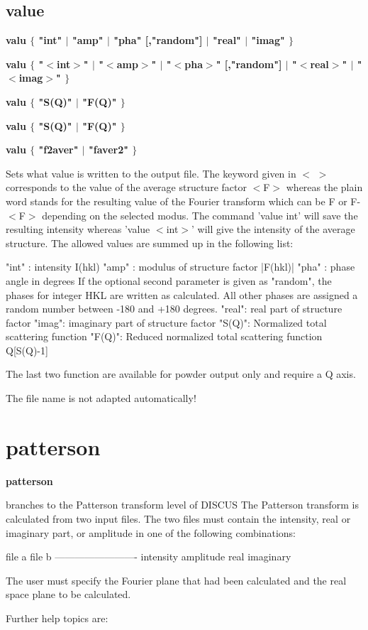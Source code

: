 \subsection*{value}
{\bf valu $ \{$  "int"  $| $  "amp"  $| $  "pha" [,"random"]  $| $  "real"  $| $  "imag" $\} $ \par }
{\bf valu $ \{$ "$ <$int$> $" $| $ "$ <$amp$> $" $| $ "$ <$pha$> $" [,"random"] $| $ "$ <$real$> $" $| $ "$ <$imag$> $" $\} $ \par }
{\bf  \par }
{\bf valu $ \{$ "S(Q)"  $| $ "F(Q)" $\} $ \par }
{\bf valu $ \{$ "S(Q)"  $| $ "F(Q)" $\} $ \par }
{\bf  \par }
{\bf valu $ \{$ "f2aver"  $| $ "faver2" $\} $ \par }
\par
\vspace{3pt}
Sets what value is written to the output file. The keyword given in 
$ <$ $> $ corresponds to the value of the average structure factor $ <$F$> $ whereas 
the plain word stands for the resulting value of the Fourier transform 
which can be F or F-$ <$F$> $ depending on the selected modus. The command 
'value int' will save the resulting intensity whereas 'value $ <$int$> $' will 
give the intensity of the average structure. The allowed values are 
summed up in the following list: 
\par
\begin{MacVerbatim}
"int" :   intensity I(hkl)
"amp" :   modulus of structure factor |F(hkl)|
"pha" :   phase angle in degrees
          If the optional second parameter is given as "random",
          the phases for integer HKL are written as calculated.
          All other phases are assigned a random number between
          -180 and +180 degrees.
"real":   real part of structure factor
"imag":   imaginary part of structure factor
"S(Q)":   Normalized total scattering function
"F(Q)":   Reduced normalized total scattering function Q[S(Q)-1]
\end{MacVerbatim}
The last two function are available for powder output only and require 
a Q axis. 
\par
The file name is not adapted automatically! 
\section{patterson}
{\bf patterson \par }
\par
\vspace{3pt}
branches to the Patterson  transform level of DISCUS 
The Patterson transform is calculated from two input files. 
The two files must contain the intensity, real or imaginary part, 
or amplitude in one of the following combinations: 
\par
\begin{MacVerbatim}
file a          file b
-------------------------
intensity
amplitude
real            imaginary
\end{MacVerbatim}
The user must specify the Fourier plane that had been calculated 
and the real space plane to be calculated. 
\par
Further help topics are: 
\par
